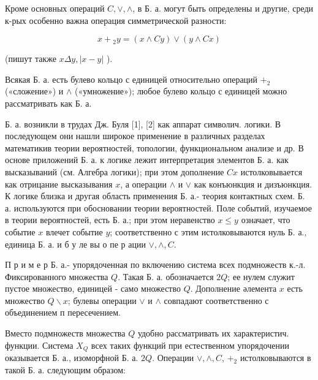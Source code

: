 \documentclass[10pt]{article}
\begin{document}
Кроме основных операций $C, \vee, \wedge$, в Б. а. могут быть определены и другие, среди к-рых особенно важна операция симметрической разности:



\[

x+{ }_{2} y=(x \wedge C y) \vee(y \wedge C x)

\]



(пишут также $x \Delta y,|x-y|$ ).



Всякая Б. а. есть булево кольцо с единицей относительно операций $+_{2}$ («сложение») и $\wedge$ («умножение»); любое булево кольцо с единицей можно рассматривать как Б. а.



Б. а. возникли в трудах Дж. Буля [1], [2] как аппарат символич. логики. В последующем они нашли широкое применение в различных разделах математикив теории вероятностей, топологии, функциональном анализе и др. В основе приложений Б. а. к логике лежит интерпретация элементов Б. а. как высказываний (см. Алгебра логики); при этом дополнение $C x$ истолковывается как отрицание высказывания $x$, а операции $\wedge$ и $\vee$ как конъюнкция и дизъюнкция. К логике близка и другая область применения Б. а.- теория контактных схем. Б. а. используются при обосновании теории вероятностей. Поле событий, изучаемое в теории вероятностей, есть Б. а.; при этом неравенство $x \leqslant y$ означает, что событие $x$ влечет событие $y$; соответственно с этим истолковываются нуль Б. а., единица Б. а. и б у ле вы о пе р ации $\vee, \wedge, C$.



П р и м е р Б. а.- упорядоченная по включению система всех подмножеств к.-л. Фиксированного множества $Q$. Такая Б. а. обозначается $2 Q$; ее нулем служит пустое множество, единицей - само множество $Q$. Дополнение әлемента $x$ есть множество $Q \backslash x$; булевы операции $\vee$ и $\wedge$ совпадают соответственно с объединением п пересечением.



Вместо подмножеств множества $Q$ удобно рассматривать их характеристич. функции. Система $X_{Q}$ всех таких функций при естественном упорядочении оказывается Б. а., изоморфной Б. а. $2 Q$. Операции $\vee, \wedge, C$, $+_{2}$ истолковываются в такой Б. а. следующим образом:
\end{document}
